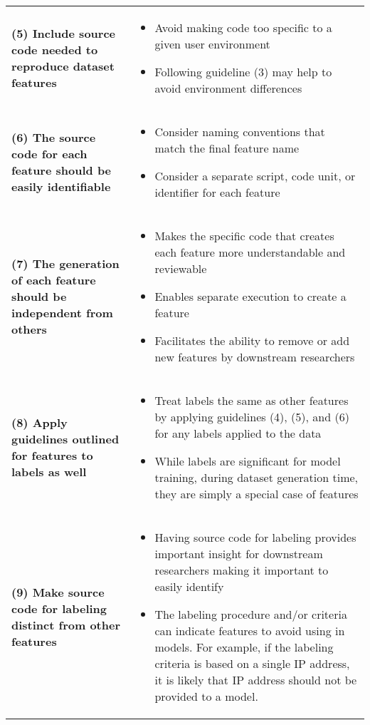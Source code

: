 \documentclass[sigconf]{acmart}
\begin{document}
\begin{table*}
\begin{tabular}{m{8cm} m{8cm}}
    \textbf{(5) Include source code needed to reproduce dataset features} &
    \begin{itemize}
        \item Avoid making code too specific to a given user environment
        \item Following guideline (3) may help to avoid environment differences
    \end{itemize} \\

    \textbf{(6) The source code for each feature should be easily identifiable} &
    \begin{itemize}
        \item Consider naming conventions that match the final  feature name
        \item Consider a separate script, code unit, or identifier for each feature
    \end{itemize} \\

    \textbf{(7) The generation of each feature should be independent from others} &
    \begin{itemize}
        \item Makes the specific code that creates each feature more understandable and reviewable
        \item Enables separate execution to create a feature
        \item Facilitates the ability to remove or add new features by downstream researchers
    \end{itemize} \\

    \textbf{(8) Apply guidelines outlined for features to labels as well} &
    \begin{itemize}
        \item Treat labels the same as other features by applying guidelines (4), (5), and (6) for any labels applied to the data
        \item While labels are significant for model training, during dataset generation time, they are simply a special case of features
    \end{itemize} \\

    \textbf{(9) Make source code for labeling distinct from other features} &
    \begin{itemize}
        \item Having source code for labeling provides important insight for downstream researchers making it important to easily identify
        \item The labeling procedure and/or criteria can indicate features to avoid using in models.
              For example, if the labeling criteria is based on a single IP address, it is likely that IP address should not be provided to a model.
    \end{itemize} \\


\end{tabular}
\end{table*}
\end{document}
